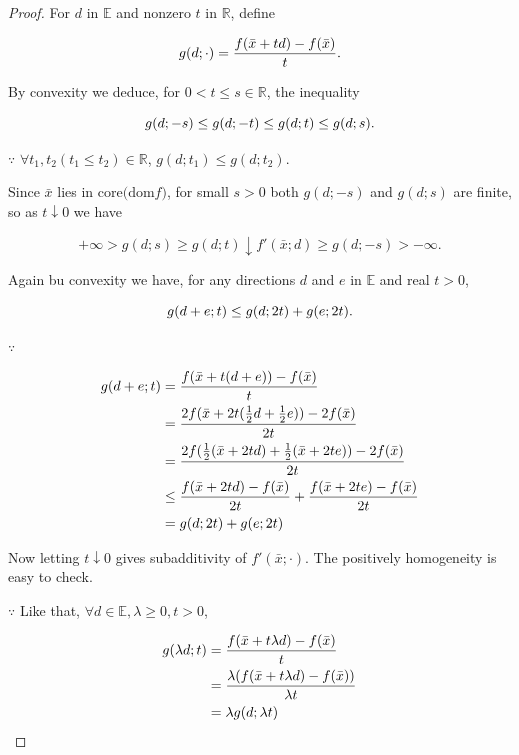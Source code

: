 \documentclass[a4paper,11pt]{jsarticle}
\begin{document}
\begin{proof}
  For $d$ in $\mathbb{E}$ and nonzero $t$ in $\mathbb{R}$, define

  \begin{equation}
    g(d; \cdot) = \frac{f(\bar{x}+td) - f(\bar{x})}{t}. \notag
  \end{equation}

  By convexity we deduce, for $0<t\leq s \in \mathbb{R}$, the inequality

  \begin{equation}
    g(d;-s) \leq g(d;-t) \leq g(d;t) \leq g(d;s). \notag
  \end{equation}

  $\because$ $\forall t_1,t_2 (t_1 \leq t_2) \in \mathbb{R}$, $g(d;t_1) \leq g(d;t_2)$.

  Since $\bar{x}$ lies in $\text{core($\text{dom}f$)}$, for small $s > 0$ both $g(d;-s)$ and $g(d;s)$ are finite, so as $t\downarrow 0$ we have

  \begin{equation}
    +\infty > g(d;s) \geq g(d;t) \downarrow f'(\bar{x};d) \geq g(d; -s) > -\infty.
  \end{equation}

  Again bu convexity we have, for any directions $d$ and $e$ in $\mathbb{E}$ and real $t>0$,

  \begin{equation}
    g(d+e;t) \leq g(d;2t) + g(e;2t). \notag
  \end{equation}

  $\because$

  \begin{equation}
    \begin{split}
      g(d+e;t) &= \frac{f(\bar{x}+t(d+e))-f(\bar{x})}{t}\\
      &= \frac{2f(\bar{x}+2t(\frac{1}{2}d+\frac{1}{2}e))-2f(\bar{x})}{2t}\\
      &= \frac{2f(\frac{1}{2}(\bar{x}+2td)+\frac{1}{2}(\bar{x}+2te))-2f(\bar{x})}{2t}\\
      &\leq \frac{f(\bar{x}+2td)-f(\bar{x})}{2t} + \frac{f(\bar{x}+2te)-f(\bar{x})}{2t}\\
      &= g(d;2t) + g(e;2t) \notag
    \end{split}
  \end{equation}

  Now letting $t \downarrow 0$ gives subadditivity of $f'(\bar{x};\cdot)$. The positively homogeneity is easy to check.

  $\because$ Like that, $\forall d \in \mathbb{E},\lambda \geq 0, t>0$,

  \begin{equation}
    \begin{split}
      g(\lambda d;t) &= \frac{f(\bar{x}+t\lambda d) - f(\bar{x})}{t}\\
      &= \frac{\lambda (f(\bar{x}+t\lambda d) - f(\bar{x}))}{\lambda t}\\
      &= \lambda g(d;\lambda t) \notag
    \end{split}
  \end{equation}

\end{proof}
\end{document}
